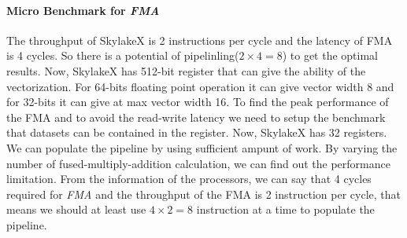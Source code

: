 \documentclass[sigconf,review,anonymous]{acmart}
\begin{document}
\paragraph{Micro Benchmark for \textit{FMA}}
The throughput of SkylakeX is 2 instructions per cycle and the latency of FMA is 4 cycles. So there is a potential 
of pipelinling($2\times 4 = 8$) to get the optimal results. Now, SkylakeX 
has 512-bit register that can give the ability of the vectorization. For 64-bits floating point operation it can give vector 
width 8 and for 32-bits it can give at max vector width 16. To find the peak performance of the FMA and to avoid the 
read-write latency we need to setup the benchmark that datasets can be contained in the register. Now, SkylakeX has 32 
registers. We can populate the pipeline by using sufficient ampunt of work. By varying the 
number of fused-multiply-addition calculation, we can find out the performance limitation. From the information of the 
processors, we can say that 4 cycles required for \textit{FMA} and the throughput of the FMA is 2 instruction per cycle, that means 
we should at least use $4\times 2=8$ instruction at a time to populate the pipeline.
\end{document}
